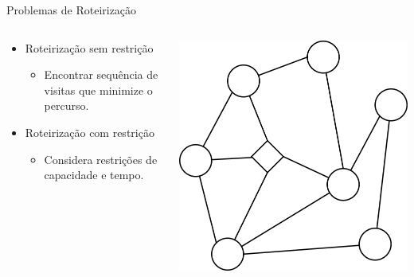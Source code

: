 \documentclass{beamer}
\newenvironment{outeritemize}{\begin{itemize}}{\end{itemize}\vspace{12pt}}
\begin{document}
\begin{frame}{Problemas de Roteirização}
    \begin{columns} 
    \begin{column}{.5\textwidth}
        \begin{outeritemize}
        \item Roteirização sem restrição
        \begin{itemize}
            \item Encontrar sequência de visitas que minimize o percurso.
        \end{itemize}
        \vspace{0.5cm}
        \item Roteirização com restrição
        \begin{itemize}
            \item Considera restrições de capacidade e tempo.
        \end{itemize}
        \end{outeritemize}
    \end{column}
    \begin{column}{.5\textwidth}
        \begin{center}
        \includegraphics[scale=0.20]{assets/Roteirizacao/R1.png}    
        \end{center}
    \end{column}
    
\end{columns}
\end{frame}
\end{document}
